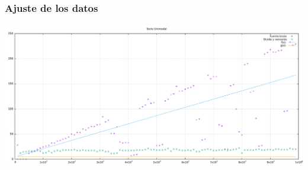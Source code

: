 \documentclass[compress]{beamer}
\begin{document}
\begin{frame}
  \frametitle{Ajuste de los datos}
  \begin{center}
  \includegraphics[scale=0.23]{ajuste.pdf}
\end{center}
\end{frame}
\end{document}

